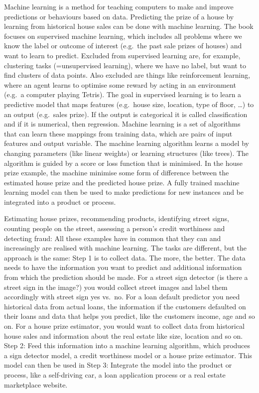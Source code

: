 \documentclass[12pt,]{krantz}
\theoremstyle{definition}
\theoremstyle{definition}
\theoremstyle{definition}
\theoremstyle{remark}
\begin{document}
Machine learning is a method for teaching computers to make and improve
predictions or behaviours based on data. Predicting the prize of a house
by learning from historical house sales can be done with machine
learning. The book focuses on supervised machine learning, which
includes all problems where we know the label or outcome of interest
(e.g.~the past sale prizes of houses) and want to learn to predict.
Excluded from supervised learning are, for example, clustering tasks
(=unsupervised learning), where we have no label, but want to find
clusters of data points. Also excluded are things like reinforcement
learning, where an agent learns to optimise some reward by acting in an
environment (e.g.~a computer playing Tetris). The goal in supervised
learning is to learn a predictive model that maps features (e.g.~house
size, location, type of floor, \ldots{}) to an output (e.g.~sales
prize). If the output is categorical it is called classification and if
it is numerical, then regression. Machine learning is a set of
algorithms that can learn these mappings from training data, which are
pairs of input features and output variable. The machine learning
algorithm learns a model by changing parameters (like linear weights) or
learning structures (like trees). The algorithm is guided by a score or
loss function that is minimised. In the house prize example, the machine
minimise some form of difference between the estimated house prize and
the predicted house prize. A fully trained machine learning model can
then be used to make predictions for new instances and be integrated
into a product or process.

Estimating house prizes, recommending products, identifying street
signs, counting people on the street, assessing a person's credit
worthiness and detecting fraud: All these examples have in common that
they can and increasingly are realised with machine learning. The tasks
are different, but the approach is the same: Step 1 is to collect data.
The more, the better. The data needs to have the information you want to
predict and additional information from which the prediction should be
made. For a street sign detector (is there a street sign in the image?)
you would collect street images and label them accordingly with street
sign yes vs.~no. For a loan default predictor you need historical data
from actual loans, the information if the customers defaulted on their
loans and data that helps you predict, like the customers income, age
and so on. For a house prize estimator, you would want to collect data
from historical house sales and information about the real estate like
size, location and so on. Step 2: Feed this information into a machine
learning algorithm, which produces a sign detector model, a credit
worthiness model or a house prize estimator. This model can then be used
in Step 3: Integrate the model into the product or process, like a
self-driving car, a loan application process or a real estate
marketplace website.
\end{document}
